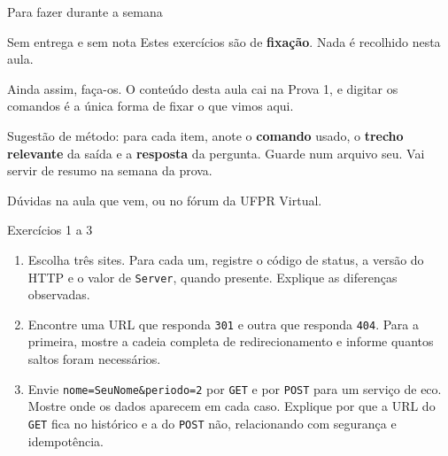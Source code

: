 \documentclass{beamer}
\begin{document}
\begin{frame}{Para fazer durante a semana}
  \begin{block}{Sem entrega e sem nota}
    Estes exercícios são de \textbf{fixação}. Nada é recolhido nesta aula.
  \end{block}

  \vspace{0.4cm}
  Ainda assim, faça-os. O conteúdo desta aula cai na Prova 1, e digitar os
  comandos é a única forma de fixar o que vimos aqui.

  \vspace{0.4cm}
  Sugestão de método: para cada item, anote o \textbf{comando} usado, o
  \textbf{trecho relevante} da saída e a \textbf{resposta} da pergunta. Guarde
  num arquivo seu. Vai servir de resumo na semana da prova.

  \vspace{0.4cm}
  Dúvidas na aula que vem, ou no fórum da UFPR Virtual.
\end{frame}

\begin{frame}{Exercícios 1 a 3}
  \begin{enumerate}
    \item Escolha três sites. Para cada um, registre o código de status, a
          versão do HTTP e o valor de \texttt{Server}, quando presente. Explique
          as diferenças observadas.

    \item Encontre uma URL que responda \texttt{301} e outra que responda
          \texttt{404}. Para a primeira, mostre a cadeia completa de
          redirecionamento e informe quantos saltos foram necessários.

    \item Envie \texttt{nome=SeuNome\&periodo=2} por \texttt{GET} e por
          \texttt{POST} para um serviço de eco. Mostre onde os dados aparecem em
          cada caso. Explique por que a URL do \texttt{GET} fica no histórico e
          a do \texttt{POST} não, relacionando com segurança e idempotência.
  \end{enumerate}
\end{frame}
\end{document}
